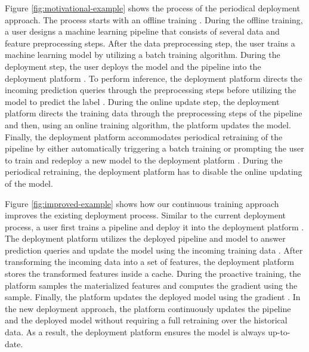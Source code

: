 Figure \ref{fig:motivational-example} shows the process of the periodical deployment approach.
The process starts with an offline training .
During the offline training, a user designs a machine learning pipeline that consists of several data and feature preprocessing steps. 
After the data preprocessing step, the user trains a machine learning model by utilizing a batch training algorithm.
During the deployment step, the user deploys the model and the pipeline into the deployment platform .
To perform inference, the deployment platform directs the incoming prediction queries through the preprocessing steps before utilizing the model to predict the label .
During the online update step, the deployment platform directs the training data through the preprocessing steps of the pipeline and then, using an online training algorithm, the platform updates the model.
Finally, the deployment platform accommodates periodical retraining of the pipeline by either automatically triggering a batch training or prompting the user to train and redeploy a new model to the deployment platform .
During the periodical retraining, the deployment platform has to disable the online updating of the model.

Figure \ref{fig:improved-example} shows how our continuous training approach improves the existing deployment process.
Similar to the current deployment process, a user first trains a pipeline  and deploy it into the deployment platform .
The deployment platform utilizes the deployed pipeline and model to answer prediction queries and update the model using the incoming training data .
After transforming the incoming data into a set of features, the deployment platform stores the transformed features inside a cache.
During the proactive training, the platform samples the materialized features and computes the gradient using the sample.
Finally, the platform updates the deployed model using the gradient .
In the new deployment approach, the platform continuously updates the pipeline and the deployed model without requiring a full retraining over the historical data.
As a result, the deployment platform ensures the model is always up-to-date.